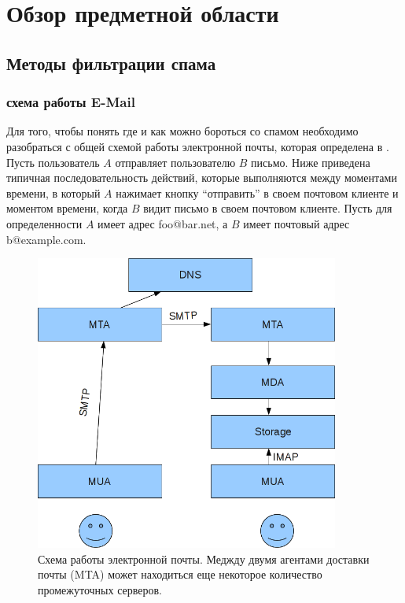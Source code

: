 \newpage
\section{Обзор предметной области}
\label{review}

\subsection{Методы фильтрации спама}
\subsubsection{схема работы E-Mail}
Для того, чтобы понять где и как можно бороться со спамом необходимо разобраться с общей схемой работы электронной почты, которая определена в \cite{RFC2081}. Пусть пользователь $A$ отправляет пользователю $B$ письмо. Ниже приведена типичная последовательность действий, которые выполняются между моментами времени, в который $A$ нажимает кнопку ``отправить'' в своем почтовом клиенте и моментом времени, когда $B$ видит письмо в своем почтовом клиенте. Пусть для определенности $A$ имеет адрес foo@bar.net, а $B$ имеет почтовый адрес b@example.com.

\begin{figure}[h]
\begin{center}
\includegraphics[width=10cm]{img/emailscheme}
\end{center}
\caption{Схема работы электронной почты. Меджду двумя агентами доставки почты (MTA) может находиться еще некоторое количество промежуточных серверов.}
\label{d_tree}
\end{figure}

